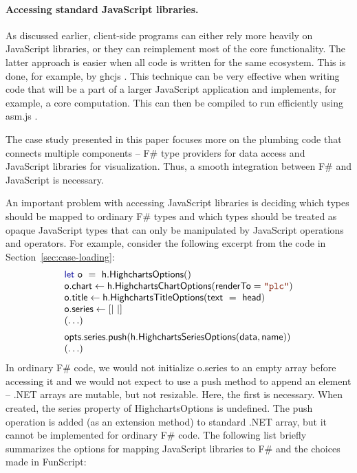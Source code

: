 \documentclass[submission,copyright,creativecommons]{eptcs}
\newcommand{\kvd}[1]{\textnormal{\textcolor{kvdclr}{\sffamily #1}}}
\newcommand{\str}[1]{\textnormal{\textcolor{strclr}{\ttfamily "#1"}}}
\newcommand{\ident}[1]{\textnormal{\sffamily #1}}
\begin{document}
\paragraph{Accessing standard JavaScript libraries.}
As discussed earlier, client-side programs can either rely more heavily on JavaScript libraries,
or they can reimplement most of the core functionality. The latter approach is easier when all code
is written for the same ecosystem. This is done, for example, by ghcjs \cite{haskell-ghcjs}.
This technique can be very effective when writing code that will be a part of a larger JavaScript
application and implements, for example, a core computation. This can then be compiled to run
efficiently using asm.js \cite{asm-js}.

The case study presented in this paper focuses more on the plumbing code that connects multiple
components -- F\# type providers for data access and JavaScript libraries for visualization. Thus,
a smooth integration between F\# and JavaScript is necessary.

An important problem with accessing JavaScript libraries is deciding which types should be 
mapped to ordinary F\# types and which types should be treated as opaque JavaScript types that
can only be manipulated by JavaScript operations and operators. For example, consider the following
excerpt from the code in Section~\ref{sec:case-loading}:
%
\begin{equation*}
\begin{array}{lll} 
 \kvd{let}~\ident{o}~=~\ident{h.HighchartsOptions}() \\
 \ident{o.chart} \leftarrow \ident{h.HighchartsChartOptions}(\ident{renderTo}=\str{plc}) \\
 \ident{o.title} \leftarrow \ident{h.HighchartsTitleOptions}(\ident{text}~=~\ident{head}) \\
 \ident{o.series} \leftarrow \lbrack| ~ |\rbrack \\
 (\ldots)
 \\[0.5em]   
 \ident{opts.series.push}(\ident{h.HighchartsSeriesOptions}(\ident{data}, \ident{name}))  \\
 (\ldots)
\end{array}
\end{equation*}
%
In ordinary F\# code, we would not initialize \ident{o.series} to an empty array before 
accessing it and we would not expect to use a \ident{push} method to append an element --
.NET arrays are mutable, but not resizable. Here, the first is necessary. When created, 
the \ident{series} property of \ident{HighchartsOptions} is \kvd{undefined}. The \ident{push}
operation is added (as an extension method) to standard .NET array, but it cannot be 
implemented for ordinary F\# code. The following list briefly summarizes the options for
mapping JavaScript libraries to F\# and the choices made in FunScript:
\end{document}
